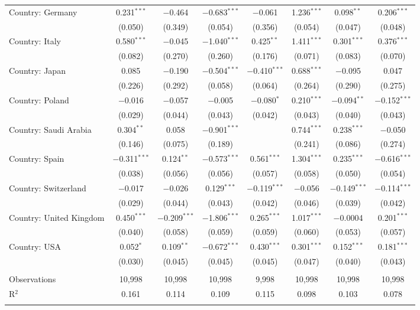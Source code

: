 \begin{tabular}{@{\extracolsep{5pt}}lccccccc}
  Country: Germany & 0.231$^{***}$ & $-$0.464 & $-$0.683$^{***}$ & $-$0.061 & 1.236$^{***}$ & 0.098$^{**}$ & 0.206$^{***}$ \\ 
  & (0.050) & (0.349) & (0.054) & (0.356) & (0.054) & (0.047) & (0.048) \\ 
  Country: Italy & 0.580$^{***}$ & $-$0.045 & $-$1.040$^{***}$ & 0.425$^{**}$ & 1.411$^{***}$ & 0.301$^{***}$ & 0.376$^{***}$ \\ 
  & (0.082) & (0.270) & (0.260) & (0.176) & (0.071) & (0.083) & (0.070) \\ 
  Country: Japan & 0.085 & $-$0.190 & $-$0.504$^{***}$ & $-$0.410$^{***}$ & 0.688$^{***}$ & $-$0.095 & 0.047 \\ 
  & (0.226) & (0.292) & (0.058) & (0.064) & (0.264) & (0.290) & (0.275) \\ 
  Country: Poland & $-$0.016 & $-$0.057 & $-$0.005 & $-$0.080$^{*}$ & 0.210$^{***}$ & $-$0.094$^{**}$ & $-$0.152$^{***}$ \\ 
  & (0.029) & (0.044) & (0.043) & (0.042) & (0.043) & (0.040) & (0.043) \\ 
  Country: Saudi Arabia & 0.304$^{**}$ & 0.058 & $-$0.901$^{***}$ &  & 0.744$^{***}$ & 0.238$^{***}$ & $-$0.050 \\ 
  & (0.146) & (0.075) & (0.189) &  & (0.241) & (0.086) & (0.274) \\ 
  Country: Spain & $-$0.311$^{***}$ & 0.124$^{**}$ & $-$0.573$^{***}$ & 0.561$^{***}$ & 1.304$^{***}$ & 0.235$^{***}$ & $-$0.616$^{***}$ \\ 
  & (0.038) & (0.056) & (0.056) & (0.057) & (0.058) & (0.050) & (0.054) \\ 
  Country: Switzerland & $-$0.017 & $-$0.026 & 0.129$^{***}$ & $-$0.119$^{***}$ & $-$0.056 & $-$0.149$^{***}$ & $-$0.114$^{***}$ \\ 
  & (0.029) & (0.044) & (0.043) & (0.042) & (0.046) & (0.039) & (0.042) \\ 
  Country: United Kingdom & 0.450$^{***}$ & $-$0.209$^{***}$ & $-$1.806$^{***}$ & 0.265$^{***}$ & 1.017$^{***}$ & $-$0.0004 & 0.201$^{***}$ \\ 
  & (0.040) & (0.058) & (0.059) & (0.059) & (0.060) & (0.053) & (0.057) \\ 
  Country: USA & 0.052$^{*}$ & 0.109$^{**}$ & $-$0.672$^{***}$ & 0.430$^{***}$ & 0.301$^{***}$ & 0.152$^{***}$ & 0.181$^{***}$ \\ 
  & (0.030) & (0.045) & (0.045) & (0.045) & (0.047) & (0.040) & (0.043) \\ 
 \hline \\[-1.8ex] 

Observations & 10,998 & 10,998 & 10,998 & 9,998 & 10,998 & 10,998 & 10,998 \\ 
R$^{2}$ & 0.161 & 0.114 & 0.109 & 0.115 & 0.098 & 0.103 & 0.078 \\ 
\hline 
\hline \\[-1.8ex] 
\end{tabular} 